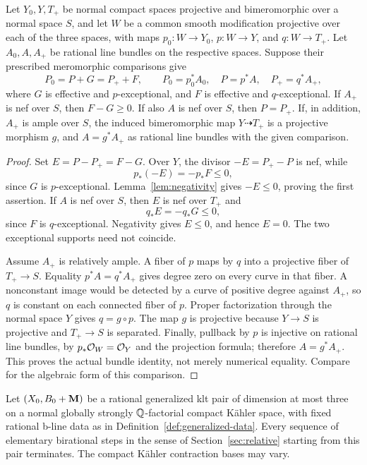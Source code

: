 \begin{lemma}\label{lem:nef-end-comparison}
Let $Y_0,Y,T_+$ be normal compact spaces projective and bimeromorphic over
a normal space $S$, and let $W$ be a common smooth modification
projective over each of the three spaces, with maps
$p_0:W\to Y_0$, $p:W\to Y$, and $q:W\to T_+$.
Let $A_0,A,A_+$ be rational line bundles on the respective spaces.
Suppose their prescribed meromorphic comparisons give
\begin{equation}\label{eq:two-target-comparison}
 P_0=P+G=P_++F,
 \qquad P_0=p_0^*A_0,\quad P=p^*A,\quad P_+=q^*A_+,
\end{equation}
where $G$ is effective and $p$-exceptional, and $F$ is effective and
$q$-exceptional.  If $A_+$ is nef over $S$, then $F-G\geq0$.
If also $A$ is nef over $S$, then $P=P_+$.  If, in addition, $A_+$ is
ample over $S$, the induced bimeromorphic map $Y\dashrightarrow T_+$
is a projective morphism $g$, and $A=g^*A_+$ as rational line bundles
with the given comparison.
\end{lemma}

\begin{proof}
Set $E=P-P_+=F-G$.  Over $Y$, the divisor $-E=P_+-P$ is nef, while
\[
 p_*(-E)=-p_*F\leq0,
\]
since $G$ is $p$-exceptional.  Lemma~\ref{lem:negativity} gives
$-E\leq0$, proving the first assertion.  If $A$ is nef over $S$, then
$E$ is nef over $T_+$ and
\[
 q_*E=-q_*G\leq0,
\]
since $F$ is $q$-exceptional.  Negativity gives $E\leq0$, and hence
$E=0$.  The two exceptional supports need not coincide.

Assume $A_+$ is relatively ample.  A fiber of $p$ maps by $q$ into a
projective fiber of $T_+\to S$.  Equality $p^*A=q^*A_+$ gives degree zero
on every curve in that fiber.  A nonconstant image would be detected by a
curve of positive degree against $A_+$, so $q$ is constant on each
connected fiber of $p$.  Proper factorization through the normal space
$Y$ gives $q=g\circ p$.  The map $g$ is projective because $Y\to S$ is
projective and $T_+\to S$ is separated.  Finally, pullback by $p$ is
injective on rational line bundles, by $p_*\mathcal O_W=\mathcal O_Y$ and the
projection formula; therefore $A=g^*A_+$.  This proves the actual bundle
identity, not merely numerical equality.  Compare
\cite[Lemma~2.12]{LMT2022} for the algebraic form of this comparison.
\end{proof}

\begin{theorem}\label{thm:gklt-three}
Let $(X_0,B_0+\mathbf M)$ be a rational generalized klt pair of dimension at
most three on a normal globally strongly $\mathbb Q$-factorial compact K\"ahler
space, with fixed rational b-line data as in
Definition~\ref{def:generalized-data}.  Every sequence of elementary
birational steps in the sense of
Section~\ref{sec:relative} starting from this pair terminates.  The
compact K\"ahler contraction bases may vary.
\end{theorem}

